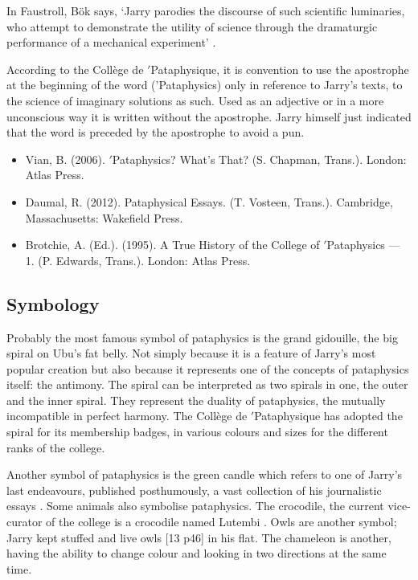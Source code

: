 In Faustroll, Bök says, `Jarry parodies the discourse of such scientific luminaries, who attempt to demonstrate the utility of science through the dramaturgic performance of a mechanical experiment' \autocite[p.29]{Boek2002}.

According to the Collège de $'$Pataphysique, it is convention to use the apostrophe at the beginning of the word ('Pataphysics) only in reference to Jarry's texts, to the science of imaginary solutions as such. Used as an adjective or in a more unconscious way it is written without the apostrophe. Jarry himself just indicated that the word is preceded by the apostrophe to avoid a pun.

\begin{itemize}
  \item Vian, B. (2006). $'$Pataphysics? What's That? (S. Chapman, Trans.). London: Atlas Press.\autocite{Vian2006}
  \item Daumal, R. (2012). Pataphysical Essays. (T. Vosteen, Trans.). Cambridge, Massachusetts: Wakefield Press.\autocite{Daumal2012}
  \item Brotchie, A. (Ed.). (1995). A True History of the College of  $'$Pataphysics --- 1. (P. Edwards, Trans.). London: Atlas Press.\autocite{Brotchie1995}
\end{itemize}


\subsection{Symbology}

Probably the most famous symbol of pataphysics is the grand gidouille, the big spiral on Ubu's fat belly. Not simply because it is a feature of Jarry's most popular creation but also because it represents one of the concepts of pataphysics itself: the antimony. The spiral can be interpreted as two spirals in one, the outer and the inner spiral. They represent the duality of pataphysics, the mutually incompatible in perfect harmony. The Collège de $'$Pataphysique has adopted the spiral for its membership badges, in various colours and sizes for the different ranks of the college.

Another symbol of pataphysics is the green candle which refers to one of Jarry's last endeavours, published posthumously, a vast collection of his journalistic essays \autocite{Hugill2012a}. Some animals also symbolise pataphysics. The crocodile, the current vice-curator of the college is a crocodile named Lutembi \autocite{Hugill2012a}. Owls are another symbol; Jarry kept stuffed and live owls \autocite[p.46]{Brotchie2011}[13 p46] in his flat. The chameleon is another, having the ability to change colour and looking in two directions at the same time.

